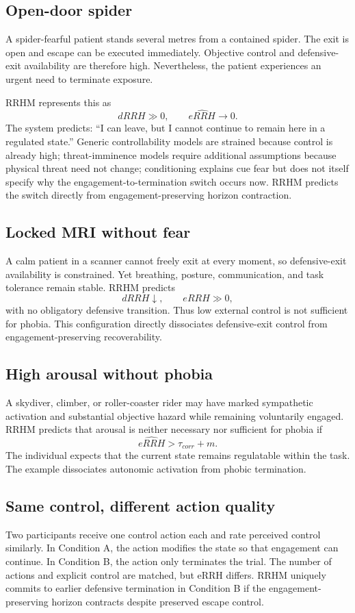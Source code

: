 \documentclass[10pt]{article}
\begin{document}
\subsection{Open-door spider}
A spider-fearful patient stands several metres from a contained spider. The exit is open and escape can be executed immediately. Objective control and defensive-exit availability are therefore high. Nevertheless, the patient experiences an urgent need to terminate exposure.

RRHM represents this as
\[
dRRH\gg0,\qquad \widehat{eRRH}\rightarrow0.
\]
The system predicts: ``I can leave, but I cannot continue to remain here in a regulated state.'' Generic controllability models are strained because control is already high; threat-imminence models require additional assumptions because physical threat need not change; conditioning explains cue fear but does not itself specify why the engagement-to-termination switch occurs now. RRHM predicts the switch directly from engagement-preserving horizon contraction.

\subsection{Locked MRI without fear}
A calm patient in a scanner cannot freely exit at every moment, so defensive-exit availability is constrained. Yet breathing, posture, communication, and task tolerance remain stable. RRHM predicts
\[
dRRH\downarrow,\qquad eRRH\gg0,
\]
with no obligatory defensive transition. Thus low external control is not sufficient for phobia. This configuration directly dissociates defensive-exit control from engagement-preserving recoverability.

\subsection{High arousal without phobia}
A skydiver, climber, or roller-coaster rider may have marked sympathetic activation and substantial objective hazard while remaining voluntarily engaged. RRHM predicts that arousal is neither necessary nor sufficient for phobia if
\[
\widehat{eRRH}>\tau_{corr}+m.
\]
The individual expects that the current state remains regulatable within the task. The example dissociates autonomic activation from phobic termination.

\subsection{Same control, different action quality}
Two participants receive one control action each and rate perceived control similarly. In Condition A, the action modifies the state so that engagement can continue. In Condition B, the action only terminates the trial. The number of actions and explicit control are matched, but eRRH differs. RRHM uniquely commits to earlier defensive termination in Condition B if the engagement-preserving horizon contracts despite preserved escape control.
\end{document}
